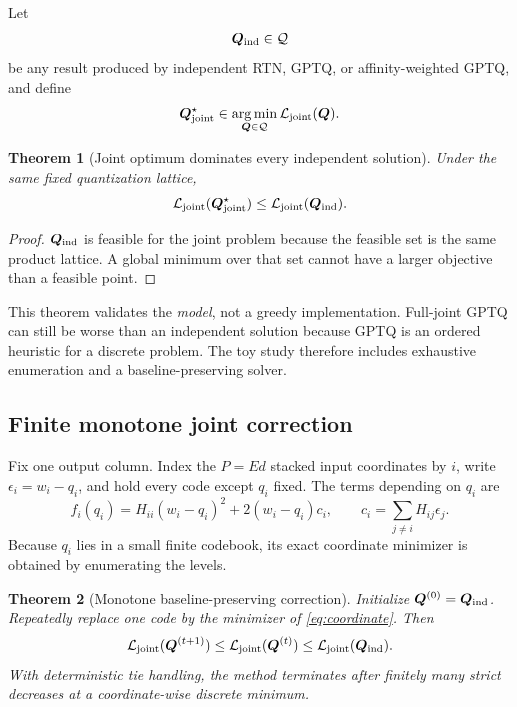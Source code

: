\documentclass[11pt]{article}
\theoremstyle{plain}
\newtheorem{theorem}{Theorem}
\theoremstyle{definition}
\theoremstyle{remark}
\newcommand{\Q}{\bm Q}
\newcommand{\calQ}{\mathcal Q}
\newcommand{\argmin}{\operatorname*{arg\,min}}
\begin{document}
Let
\begin{equation}
  \Q_{\rm ind}\in\calQ
\end{equation}
be any result produced by independent RTN, GPTQ, or affinity-weighted GPTQ, and define
\begin{equation}
  \Q_{\rm joint}^{\star}\in\argmin_{\Q\in\calQ}\mathcal L_{\rm joint}(\Q).
\end{equation}

\begin{theorem}[Joint optimum dominates every independent solution]\label{thm:dominance}
Under the same fixed quantization lattice,
\begin{equation}\label{eq:dominance}
  \mathcal L_{\rm joint}(\Q_{\rm joint}^{\star})
  \le \mathcal L_{\rm joint}(\Q_{\rm ind}).
\end{equation}
\end{theorem}

\begin{proof}
$\Q_{\rm ind}$ is feasible for the joint problem because the feasible set is the same product lattice.  A global minimum over that set cannot have a larger objective than a feasible point.
\end{proof}

This theorem validates the \emph{model}, not a greedy implementation.  Full-joint GPTQ can still be worse than an independent solution because GPTQ is an ordered heuristic for a discrete problem.  The toy study therefore includes exhaustive enumeration and a baseline-preserving solver.

\subsection{Finite monotone joint correction}

Fix one output column.  Index the $P=Ed$ stacked input coordinates by $i$, write $\epsilon_i=w_i-q_i$, and hold every code except $q_i$ fixed.  The terms depending on $q_i$ are
\begin{equation}\label{eq:coordinate}
 f_i(q_i)=H_{ii}(w_i-q_i)^2+2(w_i-q_i)c_i,
 \qquad
 c_i=\sum_{j\ne i}H_{ij}\epsilon_j.
\end{equation}
Because $q_i$ lies in a small finite codebook, its exact coordinate minimizer is obtained by enumerating the levels.

\begin{theorem}[Monotone baseline-preserving correction]\label{thm:coordinate}
Initialize $\Q^{(0)}=\Q_{\rm ind}$.  Repeatedly replace one code by the minimizer of \eqref{eq:coordinate}.  Then
\begin{equation}
\mathcal L_{\rm joint}(\Q^{(t+1)})\le
\mathcal L_{\rm joint}(\Q^{(t)})\le
\mathcal L_{\rm joint}(\Q_{\rm ind}).
\end{equation}
With deterministic tie handling, the method terminates after finitely many strict decreases at a coordinate-wise discrete minimum.
\end{theorem}
\end{document}
